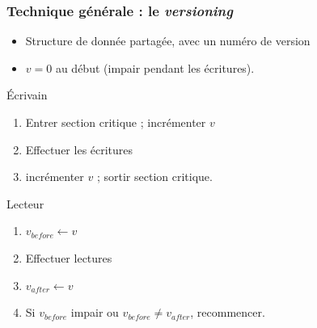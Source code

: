 \documentclass[xcolor={x11names,svgnames}]{beamer}
\begin{document}
\begin{frame}[label=versioning]
  \frametitle{Technique générale : le \emph{versioning}}

  \begin{itemize}
  \item Structure de donnée partagée, avec un \alert{numéro de version}
  \item $v = 0$ au début (\alert{impair} pendant les écritures).
  \end{itemize}

  \begin{alertblock}{Écrivain}
    \begin{enumerate}
    \item Entrer section critique ; incrémenter $v$
    \item Effectuer les écritures
    \item incrémenter $v$ ; sortir section critique.
    \end{enumerate}
  \end{alertblock}

  \begin{exampleblock}{Lecteur}
    \begin{enumerate}
    \item $v_{before} \gets v$
    \item Effectuer lectures
    \item $v_{after} \gets v$
    \item Si $v_{before}$ impair ou $v_{before} \neq v_{after}$, recommencer.
    \end{enumerate}
  \end{exampleblock}  
\end{frame}

\end{document}
